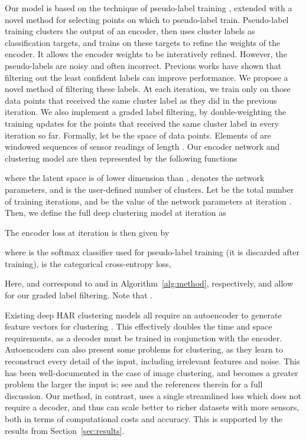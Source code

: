 \documentclass[wcp]{jmlr}
\begin{document}
Our model is based on the technique of pseudo-label training \citep{caron2018deep}, extended with a novel method for selecting points on which to pseudo-label train. Pseudo-label training clusters the output of an encoder, then uses cluster labels as classification targets, and trains on these targets to refine the weights of the encoder. It allows the encoder weights to be interatively refined. However, the pseudo-labels are noisy and often incorrect. Previous works \citep{mahon2021selective,mrabah2020deep} have shown that filtering out the least confident labels can improve performance. We propose a novel method of filtering these labels. At each iteration, we train only on those data points that received the same cluster label as they did in the previous iteration.
We also implement a graded label filtering, by double-weighting the training updates for the points that received the same cluster label in every iteration so far. Formally, let  be the space of data points. Elements of  are windowed sequences of sensor readings of length . Our encoder network  and clustering model  are then represented by the following functions 

where the latent space  is of lower dimension than ,  denotes the network parameters, and  is the user-defined number of clusters. Let  be the total number of training iterations, and  be the value of the network parameters at iteration . Then, we define the full deep clustering model at iteration  as

The encoder loss at iteration  is then given by

where  is the softmax classifier used for pseudo-label training (it is discarded after training),  is the categorical cross-entropy loss, 
\begin{spreadlines}{10pt}

\end{spreadlines}
Here,  and  correspond to  and  in Algorithm~\ref{alg:method}, respectively, and allow for our graded label filtering. Note that .

Existing deep HAR clustering models all require an autoencoder to generate feature vectors for clustering \citep{sheng2020unsupervised,ma2021unsupervised,mcconville2021n2d}. This effectively doubles the time and space requirements, as a decoder must be trained in conjunction with the encoder. Autoencoders can also present some problems for clustering, as they learn to reconstruct every detail of the input, including irrelevant features and noise. This has been well-documented in the case of image clustering, and becomes a greater problem the larger the input is; see \citep{mrabah2020deep} and the references therein for a full discussion. Our method, in contrast, uses a single streamlined loss which does not require a decoder, and thus can scale better to richer datasets with more sensors, both in terms of computational costs and accuracy. This is supported by the results from Section~\ref{sec:results}.
\end{document}
